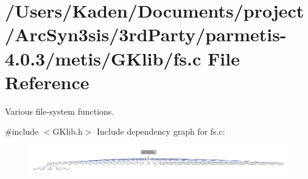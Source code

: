\hypertarget{a00035}{}\section{/\+Users/\+Kaden/\+Documents/project/\+Arc\+Syn3sis/3rd\+Party/parmetis-\/4.0.3/metis/\+G\+Klib/fs.c File Reference}
\label{a00035}


Various file-\/system functions.  


{\ttfamily \#include $<$G\+Klib.\+h$>$}\newline
Include dependency graph for fs.\+c\+:\nopagebreak
\begin{figure}[H]
\begin{center}
\leavevmode
\includegraphics[width=350pt]{a00036}
\end{center}
\end{figure}
